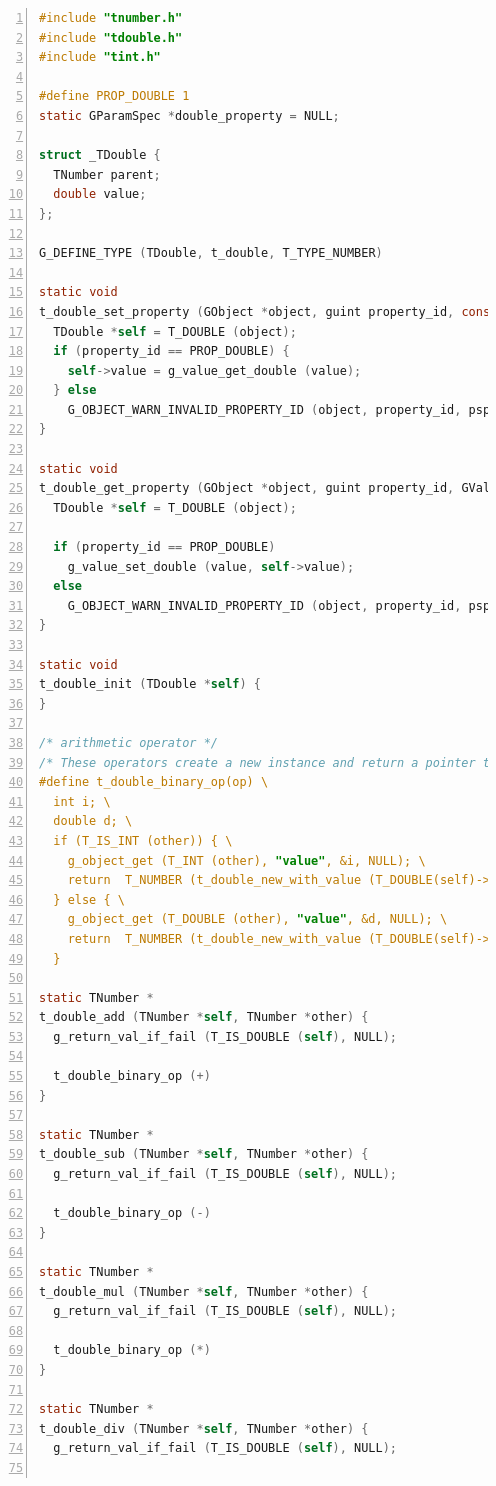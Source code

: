 \begin{lstlisting}[language=C, numbers=left]
#include "tnumber.h"
#include "tdouble.h"
#include "tint.h"

#define PROP_DOUBLE 1
static GParamSpec *double_property = NULL;

struct _TDouble {
  TNumber parent;
  double value;
};

G_DEFINE_TYPE (TDouble, t_double, T_TYPE_NUMBER)

static void
t_double_set_property (GObject *object, guint property_id, const GValue *value, GParamSpec *pspec) {
  TDouble *self = T_DOUBLE (object);
  if (property_id == PROP_DOUBLE) {
    self->value = g_value_get_double (value);
  } else
    G_OBJECT_WARN_INVALID_PROPERTY_ID (object, property_id, pspec);
}

static void
t_double_get_property (GObject *object, guint property_id, GValue *value, GParamSpec *pspec) {
  TDouble *self = T_DOUBLE (object);

  if (property_id == PROP_DOUBLE)
    g_value_set_double (value, self->value);
  else
    G_OBJECT_WARN_INVALID_PROPERTY_ID (object, property_id, pspec);
}

static void
t_double_init (TDouble *self) {
}

/* arithmetic operator */
/* These operators create a new instance and return a pointer to it. */
#define t_double_binary_op(op) \
  int i; \
  double d; \
  if (T_IS_INT (other)) { \
    g_object_get (T_INT (other), "value", &i, NULL); \
    return  T_NUMBER (t_double_new_with_value (T_DOUBLE(self)->value op (double) i)); \
  } else { \
    g_object_get (T_DOUBLE (other), "value", &d, NULL); \
    return  T_NUMBER (t_double_new_with_value (T_DOUBLE(self)->value op d)); \
  }

static TNumber *
t_double_add (TNumber *self, TNumber *other) {
  g_return_val_if_fail (T_IS_DOUBLE (self), NULL);

  t_double_binary_op (+)
}

static TNumber *
t_double_sub (TNumber *self, TNumber *other) {
  g_return_val_if_fail (T_IS_DOUBLE (self), NULL);

  t_double_binary_op (-)
}

static TNumber *
t_double_mul (TNumber *self, TNumber *other) {
  g_return_val_if_fail (T_IS_DOUBLE (self), NULL);

  t_double_binary_op (*)
}

static TNumber *
t_double_div (TNumber *self, TNumber *other) {
  g_return_val_if_fail (T_IS_DOUBLE (self), NULL);


\end{lstlisting}
